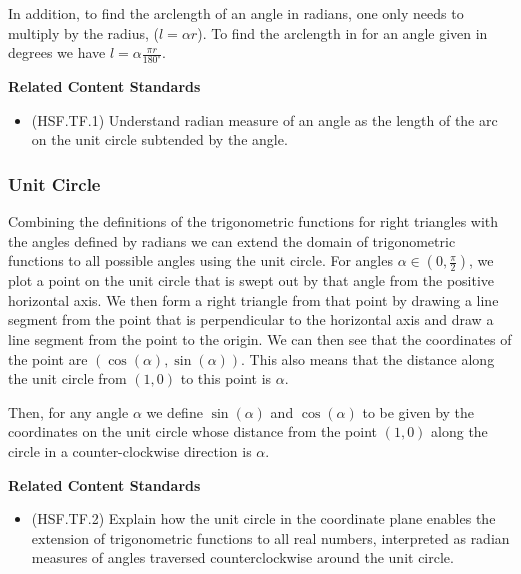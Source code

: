 \documentclass[
]{book}
\providecommand{\tightlist}{%
  \setlength{\itemsep}{0pt}\setlength{\parskip}{0pt}}
\newenvironment{standards}{}{}
\theoremstyle{definition}
\theoremstyle{definition}
\theoremstyle{definition}
\theoremstyle{definition}
\theoremstyle{remark}
\begin{document}
In addition, to find the arclength of an angle in radians, one only needs to multiply by the radius, (\(l=\alpha r\)). To find the arclength in for an angle given in degrees we have \(l=\alpha \frac{\pi r}{180^\circ}\).

\begin{standards}

\begin{center}
\textbf{Related Content Standards}

\end{center}

\begin{itemize}
\tightlist
\item
  (HSF.TF.1) Understand radian measure of an angle as the length of the arc on the unit circle subtended by the angle.
\end{itemize}

\end{standards}

\hypertarget{unit-circle}{%
\subsubsection{Unit Circle}\label{unit-circle}}

Combining the definitions of the trigonometric functions for right triangles with the angles defined by radians we can extend the domain of trigonometric functions to all possible angles using the unit circle. For angles \(\alpha \in \left(0,\frac{\pi}{2} \right)\), we plot a point on the unit circle that is swept out by that angle from the positive horizontal axis. We then form a right triangle from that point by drawing a line segment from the point that is perpendicular to the horizontal axis and draw a line segment from the point to the origin. We can then see that the coordinates of the point are \((\cos(\alpha),\sin(\alpha))\). This also means that the distance along the unit circle from \((1,0)\) to this point is \(\alpha\).

Then, for any angle \(\alpha\) we define \(\sin(\alpha)\) and \(\cos(\alpha)\) to be given by the coordinates on the unit circle whose distance from the point \((1,0)\) along the circle in a counter-clockwise direction is \(\alpha\).

\begin{standards}

\begin{center}
\textbf{Related Content Standards}

\end{center}

\begin{itemize}
\tightlist
\item
  (HSF.TF.2) Explain how the unit circle in the coordinate plane enables the extension of trigonometric functions to all real numbers, interpreted as radian measures of angles traversed counterclockwise around the unit circle.
\end{itemize}

\end{standards}
\end{document}
